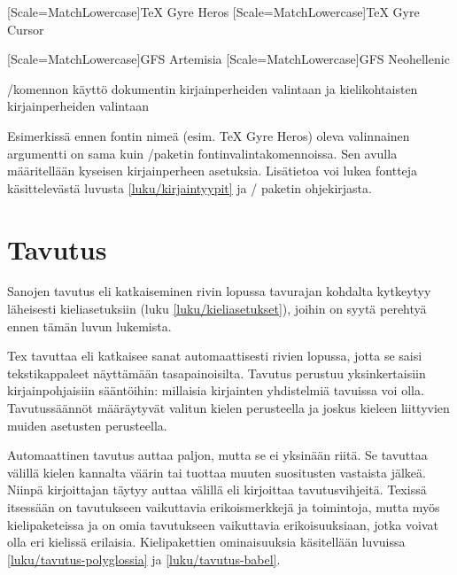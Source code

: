 \begin{esimerkki*}

\begin{koodilohko}
[Scale=MatchLowercase]{TeX Gyre Heros}
[Scale=MatchLowercase]{TeX Gyre Cursor}

[Scale=MatchLowercase]{GFS Artemisia}
[Scale=MatchLowercase]{GFS Neohellenic}
\end{koodilohko}
  \caption{\-/komennon käyttö dokumentin
    kirjainperheiden valintaan ja kielikohtaisten kirjainperheiden
    valintaan}
  \label{esim/babelfont}
\end{esimerkki*}

Esimerkissä ennen fontin nimeä (esim. TeX Gyre Heros) oleva valinnainen
argumentti on sama kuin \-/paketin
fontinvalintakomennoissa. Sen avulla määritellään kyseisen
kirjainperheen asetuksia. Lisätietoa voi lukea fontteja käsittelevästä
luvusta \ref{luku/kirjaintyypit} ja \-/ paketin
ohjekirjasta.

\section{Tavutus}
\label{luku/tavutus}

Sanojen tavutus eli katkaiseminen rivin lopussa tavurajan kohdalta
kytkeytyy läheisesti kieliasetuksiin (luku \ref{luku/kieliasetukset}),
joihin on syytä perehtyä ennen tämän luvun lukemista.

Tex tavuttaa eli katkaisee sanat automaattisesti rivien lopussa, jotta
se saisi tekstikappaleet näyttämään tasapainoisilta. Tavutus perustuu
yksinkertaisiin kirjainpohjaisiin sääntöihin: millaisia kirjainten
yhdistelmiä tavuissa voi olla. Tavutussäännöt määräytyvät valitun kielen
perusteella ja joskus kieleen liittyvien muiden asetusten perusteella.

Automaattinen tavutus auttaa paljon, mutta se ei yksinään riitä. Se
tavuttaa välillä kielen kannalta väärin tai tuottaa muuten suositusten
vastaista jälkeä. Niinpä kirjoittajan täytyy auttaa välillä eli
kirjoittaa tavutusvihjeitä. Texissä itsessään on tavutukseen vaikuttavia
erikoismerkkejä ja toimintoja, mutta myös kielipaketeissa
 ja  on omia tavutukseen vaikuttavia
erikoisuuksiaan, jotka voivat olla eri kielissä erilaisia.
Kielipakettien ominaisuuksia käsitellään luvuissa
\ref{luku/tavutus-polyglossia} ja \ref{luku/tavutus-babel}.

